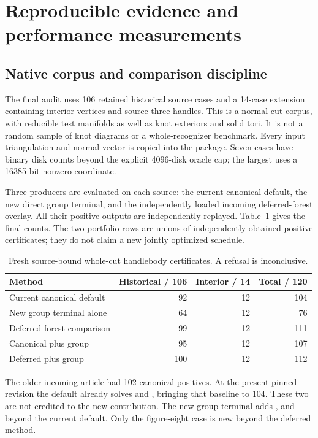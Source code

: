 \section{Reproducible evidence and performance measurements}
\label{sec:experiments}

\subsection{Native corpus and comparison discipline}

The final audit uses 106 retained historical source cases and a 14-case
extension containing interior vertices and source three-handles. This is a
normal-cut corpus, with reducible test manifolds as well as knot exteriors and
solid tori. It is not a random sample of knot diagrams or a whole-recognizer
benchmark. Every input triangulation and normal vector is copied into the
package. Seven cases have binary disk counts beyond the explicit 4096-disk
oracle cap; the largest uses a 16385-bit nonzero coordinate.

Three producers are evaluated on each source: the current canonical default,
the new direct group terminal, and the independently loaded incoming
deferred-forest overlay. All their positive outputs are independently replayed.
Table~\ref{tab:coverage} gives the final counts. The two portfolio rows are
unions of independently obtained positive certificates; they do not claim a
new jointly optimized schedule.

\begin{table}[htbp]
\centering
\begin{tabular}{lrrr}
\toprule
Method & Historical / 106 & Interior / 14 & Total / 120 \\
\midrule
Current canonical default & 92 & 12 & 104 \\
New group terminal alone & 64 & 12 & 76 \\
Deferred-forest comparison & 99 & 12 & 111 \\
Canonical plus group & 95 & 12 & 107 \\
Deferred plus group & 100 & 12 & 112 \\
\bottomrule
\end{tabular}
\caption{Fresh source-bound whole-cut handlebody certificates. A refusal is inconclusive.}
\label{tab:coverage}
\end{table}

The older incoming article had 102 canonical positives. At the present pinned
revision the default already solves  and
, bringing that baseline to 104. These two
are not credited to the new contribution. The new group terminal adds
,  and
 beyond the current default. Only the figure-eight
case is new beyond the deferred method.

